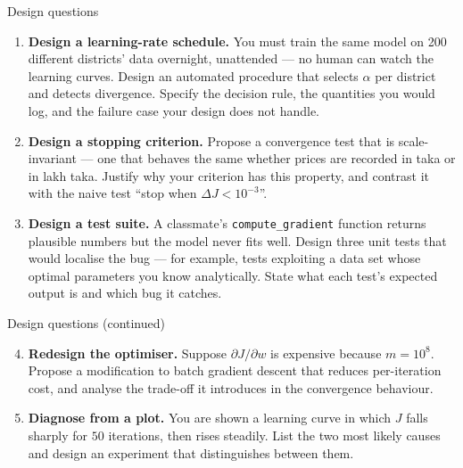 \documentclass[aspectratio=169,10pt]{beamer}
\begin{document}
\begin{frame}{Design questions}
  \small
  \begin{enumerate}
    \item \textbf{Design a learning-rate schedule.} You must train the same model
          on 200 different districts' data overnight, unattended --- no human can
          watch the learning curves. Design an automated procedure that selects
          $\alpha$ per district and detects divergence. Specify the decision rule,
          the quantities you would log, and the failure case your design does not
          handle. \hfill{}
    \item \textbf{Design a stopping criterion.} Propose a convergence test that is
          scale-invariant --- one that behaves the same whether prices are
          recorded in taka or in lakh taka. Justify why your criterion has this
          property, and contrast it with the naive test
          ``stop when $\Delta J < 10^{-3}$''. \hfill{}
    \item \textbf{Design a test suite.} A classmate's \texttt{compute\_gradient}
          function returns plausible numbers but the model never fits well. Design
          three unit tests that would localise the bug --- for example, tests
          exploiting a data set whose optimal parameters you know analytically.
          State what each test's expected output is and which bug it catches.
          \hfill{}
  \end{enumerate}
\end{frame}

\begin{frame}{Design questions (continued)}
  \small
  \begin{enumerate}\setcounter{enumi}{3}
    \item \textbf{Redesign the optimiser.} Suppose $\partial J/\partial w$ is
          expensive because $m = 10^{8}$. Propose a modification to batch gradient
          descent that reduces per-iteration cost, and analyse the trade-off it
          introduces in the convergence behaviour. \hfill{}
    \item \textbf{Diagnose from a plot.} You are shown a learning curve in which
          $J$ falls sharply for $50$ iterations, then rises steadily. List the two
          most likely causes and design an experiment that distinguishes between
          them. \hfill{}
  \end{enumerate}
\end{frame}
\end{document}

